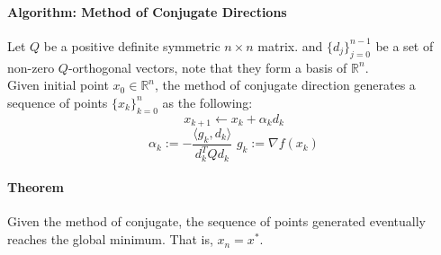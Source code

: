 \documentclass[11pt]{article}
\newcommand{\real}[0]{\mathbb{R}}
\begin{document}
\paragraph{Algorithm: Method of Conjugate Directions}
Let $Q$ be a positive definite symmetric $n \times n$ matrix. and $\{d_j\}_{j=0}^{n-1}$ be a set of non-zero $Q$-orthogonal vectors, note that they form a basis of $\real^n$. \\
Given initial point $x_0 \in \real^n$, the method of conjugate direction generates a sequence of points $\{x_k\}_{k=0}^n$ as the following:
$$x_{k+1} \leftarrow x_k + \alpha_k d_k$$
$$\alpha_k := -\frac{\langle g_k, d_k\rangle}{d_k^TQd_k} \,\, g_k := \nabla f(x_k)$$
\paragraph{Theorem} Given the method of conjugate, the sequence of points generated eventually reaches the global minimum. That is, $x_{n} = x^*$. \\
\end{document}

